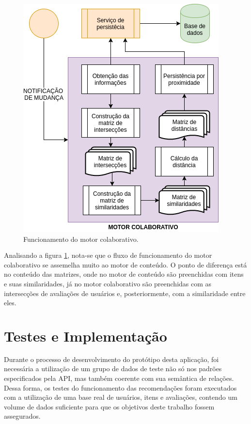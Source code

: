 \documentclass[12pt, openright, oneside, a4paper, brazil]{abntex2}
\begin{document}
\begin{figure}[h!tp]
	\caption{\label{collaborative_engine}Funcionamento do motor colaborativo.}
	\begin{center}
		\includegraphics[scale=0.8]{images/collaborative_engine.png}
	\end{center}
	\hspace{5.5cm}{Fonte: O Autor.}
\end{figure}

Analisando a figura \ref{collaborative_engine}, nota-se que o fluxo de funcionamento do motor colaborativo se assemelha muito ao motor de conteúdo. O ponto de diferença está no conteúdo das matrizes, onde no motor de conteúdo são preenchidas com itens e suas similaridades, já no motor colaborativo são preenchidas com as intersecções de avaliações de usuários e, posteriormente, com a similaridade entre eles.

\section{Testes e Implementação} \label{testes}

Durante o processo de desenvolvimento do protótipo desta aplicação, foi necessária a utilização de um grupo de dados de teste não só nos padrões especificados pela API, mas também coerente com sua semântica de relações. Dessa forma, os testes do funcionamento das recomendações foram executados com a utilização de uma base real de usuários, itens e avaliações, contendo um volume de dados suficiente para que os objetivos deste trabalho fossem assegurados.
\end{document}
